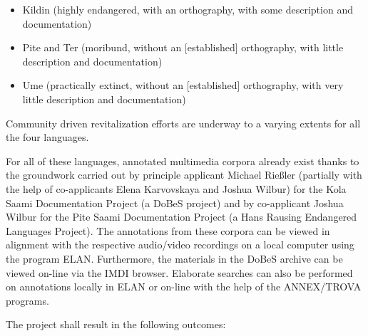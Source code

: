 \documentclass[a4paper,12pt]{article}
\begin{document}
\begin{itemize}
\item Kildin (highly endangered, with an orthography, with some description and documentation)
\item Pite and Ter (moribund, without an [established] orthography, with little description and documentation)
\item Ume (practically extinct, without an [established] orthography, with very little description and documentation)
\end{itemize}

Community driven revitalization efforts are underway to a varying extents for all the four languages.

For all of these languages, annotated multimedia corpora already exist thanks to the groundwork carried out by principle applicant Michael Rießler (partially with the help of co-applicants Elena Karvovskaya and Joshua Wilbur) for the Kola Saami Documentation Project (a DoBeS project) and by co-applicant Joshua Wilbur for the Pite Saami Documentation Project (a Hans Rausing Endangered Languages Project). The annotations from these corpora can be viewed in alignment with the respective audio/video recordings on a local computer using the program ELAN. Furthermore, the materials in the DoBeS archive can be viewed on-line via the IMDI browser. Elaborate searches can also be performed on annotations locally in ELAN or on-line with the help of the ANNEX/TROVA programs.

The project shall result in the following outcomes:\\
\end{document}
